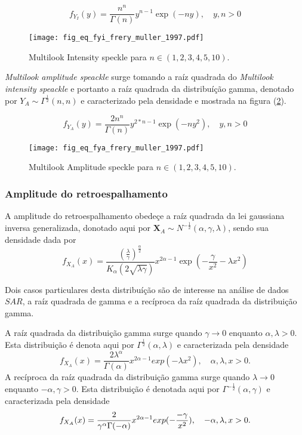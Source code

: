 \begin{equation}\label{eqn102}
	f_{Y_{I}}(y)=\frac{n^{n}}{\Gamma(n)}y^{n-1}\exp\left(-ny\right),\quad y,n>0 
\end{equation}

\begin{figure}[!htb]
\centering
\texttt{[image: fig\_eq\_fyi\_frery\_muller\_1997.pdf]}
	\caption{Multilook Intensity speckle  para $n\in(1,2,3,4,5,10)$.}
\label{fig9}
\end{figure}

{\it Multilook amplitude speackle} surge tomando a raíz quadrada do {\it Multilook intensity speackle} e portanto a raíz quadrada da distribuíção gamma, denotado por $Y_{A}\sim \Gamma^{\frac{1}{2}}(n,n)$ e caracterizado pela densidade e mostrada na figura  (\ref{fig10}).

\begin{equation}\label{eqn103}
	f_{Y_{A}}(y)=\frac{2n^{n}}{\Gamma(n)}y^{2*n-1}\exp\left(-ny^2\right),\quad y,n>0 
\end{equation}
\begin{figure}[!htb]
\centering
\texttt{[image: fig\_eq\_fya\_frery\_muller\_1997.pdf]}
	\caption{Multilook Amplitude speckle  para $n\in(1,2,3,4,5,10)$.}
\label{fig10}
\end{figure}
\subsubsection{Amplitude do retroespalhamento}

A amplitude do retroespalhamento obedeçe a raíz quadrada da lei gaussiana inversa generalizada, donotado aqui por $\mathbf{X}_{A}\sim N^{-\frac{1}{2}}(\alpha,\gamma,\lambda)$, sendo sua densidade dada por
\begin{equation}\label{eqn104}
	f_{X_{A}}(x)=\frac{\left(\frac{\lambda}{\gamma}\right)^{\frac{\alpha}{2}}}{K_{\alpha}(2\sqrt{\lambda\gamma})}x^{2\alpha-1}\exp\left(-\frac{\gamma}{x^2}-\lambda x^2\right) 
\end{equation}

Dois casos particulares desta distribuíção são de interesse na análise de dados $SAR$, a raíz quadrada de gamma e a recíproca da raíz quadrada da distribuição gamma. 

A raíz quadrada da distribuição gamma surge quando $\gamma \rightarrow 0$ enquanto $\alpha,\lambda>0$. Esta distribuição é denota aqui por $\Gamma^{\frac{1}{2}}(\alpha,\lambda)$ e caracterizada pela densidade 
\begin{equation}\label{eqn105}
	f_{X_{A}}(x)=\frac{2\lambda^{\alpha}}{\Gamma(\alpha)}x^{2\alpha-1}exp(-\lambda x^2), \quad \alpha,\lambda, x>0. 
\end{equation}
A recíproca da raíz quadrada da distribuição gamma surge quando $\lambda\rightarrow 0$ enquanto $-\alpha,\gamma>0$. Esta distribuição é denotada aqui por $\Gamma^{-\frac{1}{2}}(\alpha,\gamma) $ e caracterizada pela densidade
\begin{equation}\label{eqn106}
	f_{X_{A}}(x)=\frac{2}{\gamma^{\alpha}\Gamma(-\alpha)}x^{2\alpha-1}exp(-\frac{-\gamma}{x^2}), \quad -\alpha,\lambda, x>0. \\
\end{equation}


